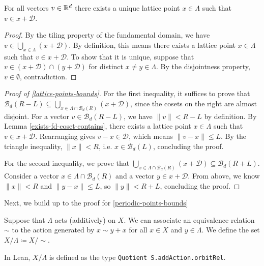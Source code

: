 \begin{lemma}\label{exists-fd-coset-contains}\lean{}
  For all vectors $v \in \mathbb{R}^d$ there exists a unique lattice point $x \in \Lambda$ such that $v \in x + \mathcal{D}$.
\end{lemma}
\begin{proof}
  By the tiling property of the fundamental domain, we have $v \in \bigcup_{x \in \Lambda} (x + \mathcal{D})$. By definition, this means there exists a lattice point $x \in \Lambda$ such that $v \in x + \mathcal{D}$. To show that it is unique, suppose that $v \in (x + \mathcal{D}) \cap (y + \mathcal{D})$ for distinct $x \neq y \in \Lambda$. By the disjointness property, $v \in \emptyset$, contradiction.
\end{proof}

\begin{proof}[Proof of \cref{lattice-points-bounds}]\label{lattice-points-bounds-proof}
  For the first inequality, it suffices to prove that $\mathcal{B}_d(R - L) \subseteq \bigcup_{x \in \Lambda \cap \mathcal{B}_d(R)} (x + \mathcal{D})$, since the cosets on the right are almost disjoint. For a vector $v \in \mathcal{B}_d(R - L)$, we have $\|v\| < R - L$ by definition. By Lemma \cref{exists-fd-coset-contains}, there exists a lattice point $x \in \Lambda$ such that $v \in x + \mathcal{D}$. Rearranging gives $v - x \in \mathcal{D}$, which means $\|v - x\| \leq L$. By the triangle inequality, $\|x\| < R$, i.e. $x \in \mathcal{B}_d(L)$, concluding the proof.

  For the second inequality, we prove that $\bigcup_{x \in \Lambda \cap \mathcal{B}_d(R)} (x + \mathcal{D}) \subseteq \mathcal{B}_d(R + L)$. Consider a vector $x \in \Lambda \cap \mathcal{B}_d(R)$ and a vector $y \in x + \mathcal{D}$. From above, we know $\|x\| < R$ and $\|y - x\| \leq L$, so $\|y\| < R + L$, concluding the proof.
\end{proof}

Next, we build up to the proof for \cref{periodic-points-bounds}

\begin{definition}\label{periodic-quot-lattice-def}
  Suppose that $\Lambda$ acts (additively) on $X$. We can associate an equivalence relation $\sim$ to the action generated by $x \sim y + x$ for all $x \in X$ and $y \in \Lambda$. We define the set $X / \Lambda \coloneqq X / \sim$. 
\end{definition}

In Lean, $X / \Lambda$ is defined as the type \texttt{Quotient S.addAction.orbitRel}.

